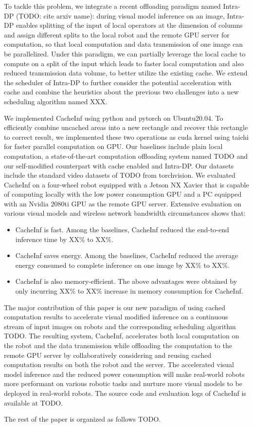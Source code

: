 To tackle this problem, we integrate a recent offloading paradigm named Intra-DP (TODO: cite arxiv name): during visual model inference on an image, Intra-DP enables splitting of the input of local operators at the dimension of columns and assign different splits to the local robot and the remote GPU server for computation, so that local computation and data transmission of one image can be parallelized.
Under this paradigm, we can partially leverage the local cache to compute on a split of the input which leads to faster local computation and also reduced transmission data volume, to better utilize the existing cache. 
We extend the scheduler of Intra-DP to further consider the potential acceleration with cache and combine the heuristics about the previous two challenges into a new scheduling algorithm named XXX.

We implemented CacheInf using python and pytorch on Ubuntu20.04. 
To efficiently combine uncached areas into a new rectangle and recover this rectangle to correct result, we implemented these two operations as cuda kernel using taichi for faster parallel computation on GPU.
Our baselines include plain local computation, a state-of-the-art computation offloading system named TODO and our self-modified counterpart with cache enabled and Intra-DP.
Our datasets include the standard video datasets of TODO from torchvision.
We evaluated CacheInf on a four-wheel robot equipped with a Jetson NX Xavier that is capable of computing locally with the low power consumption GPU and a PC equipped with an Nvidia 2080ti GPU as the remote GPU server.
Extensive evaluation on various visual models and wireless network bandwidth circumstances shows that:
\begin{itemize}
    \item CacheInf is fast. Among the baselines, CacheInf reduced the end-to-end inference time by XX\% to XX\%.
    \item CacheInf saves energy. Among the baselines, CacheInf reduced the average energy consumed to complete inference on one image by XX\% to XX\%.
    \item CacheInf is also memory-efficient. The above advantages were obtained by only incurring XX\% to XX\% increase in memory consumption for CacheInf.
\end{itemize}

The major contribution of this paper is our new paradigm of using cached computation results to accelerate visual modified inference on a continuous stream of input images on robots and the corresponding scheduling algorithm TODO.
The resulting system, CacheInf, accelerates both local computation on the robot and the data transmission while offloading the computation to the remote GPU server by collaboratively considering and reusing cached computation results on both the robot and the server.
The accelerated visual model inference and the reduced power consumption will make real-world robots more performant on various robotic tasks and nurture more visual models to be deployed in real-world robots.
The source code and evaluation logs of CacheInf is available at TODO.

The rest of the paper is organized as follows TODO.

